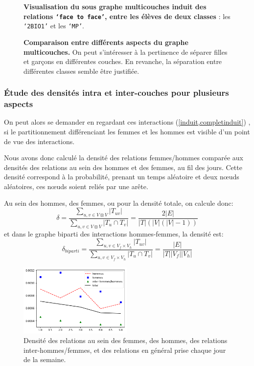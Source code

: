 \documentclass[11pt,a4paper]{article}
\theoremstyle{definition}
\theoremstyle{remark}
\theoremstyle{remark}
\begin{document}
\begin{figure}[H]
\begin{minipage}[t]{0.48\textwidth}
		\captionsetup{margin=10pt}
		\caption{\textbf{Visualisation du sous graphe multicouches induit des relations \texttt{`face to face'}, entre les élèves de deux classes} : les \texttt{`2BIO1'} et les \texttt{`MP'}.}
	\end{minipage}
	\caption{\textbf{Comparaison entre différents aspects du graphe multicouches. } On peut s'intéresser à la pertinence de séparer filles et garçons en différentes couches. En revanche, la séparation entre différentes classes semble être justifiée.}
	\label{induit}
\end{figure}
	
	
\subsubsection{Étude des densités intra et inter-couches pour plusieurs aspects}
	On peut alors se demander en regardant ces interactions (\cref{induit,completinduit}) , si le partitionnement différenciant les femmes et les hommes est \og visible \fg{} d'un point de vue des interactions.

Nous avons donc calculé la densité des relations femmes/hommes comparée aux densités des relations au sein des hommes et des femmes, au fil des jours. Cette densité correspond à la probabilité, prenant un temps aléatoire et deux n\oe{}uds aléatoires, ces n\oe{}uds soient reliés par une arête.

Au sein des hommes, des femmes, ou pour la densité totale, on calcule donc:$$
\delta = \frac{\sum_{u,v \in V\otimes V} |T_{uv}|}{\sum_{u,v \in V \otimes V}|T_u\cap T_v|} = \frac{2|E|}{|T|(|V|(|V|-1))}$$
et dans le graphe biparti des interactions hommes-femmes, la densité est:
$$\delta_{biparti}=\frac{\sum_{u,v \in V_f \times V_h} |T_{uv}|}{\sum_{u,v \in V_f \times V_h}|T_u\cap T_v|}=\frac{|E|}{|T||V_f||V_h|}$$
\begin{figure}[H]
	\centering
	\includegraphics[width=0.5\textwidth]{compfg.png}
	\caption{Densité des relations au sein des femmes, des hommes, des relations inter-hommes/femmes, et des relations en général prise chaque jour de la semaine.}
	\label{densitesemaine}
\end{figure}
\end{document}
